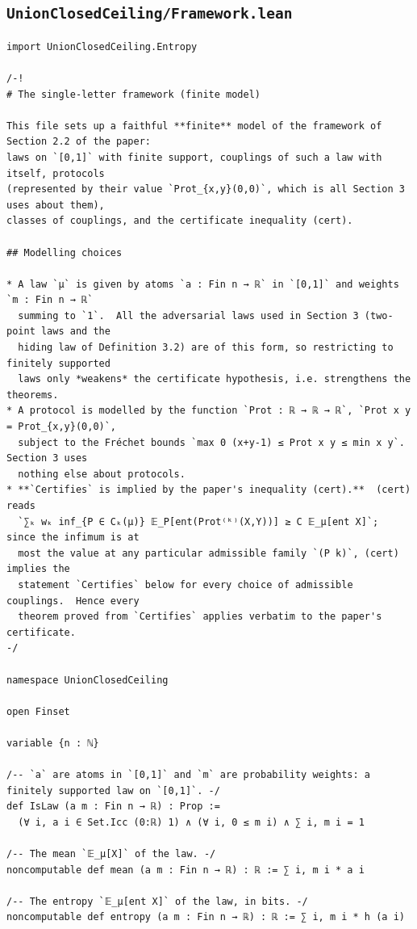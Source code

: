 \documentclass[11pt,a4paper]{article}
\theoremstyle{definition}
\theoremstyle{remark}
\begin{document}
\subsection{\texttt{UnionClosedCeiling/Framework.lean}}
\begin{Verbatim}[fontsize=\scriptsize,formatcom=\leanmono,samepage=false]
import UnionClosedCeiling.Entropy

/-!
# The single-letter framework (finite model)

This file sets up a faithful **finite** model of the framework of Section 2.2 of the paper:
laws on `[0,1]` with finite support, couplings of such a law with itself, protocols
(represented by their value `Prot_{x,y}(0,0)`, which is all Section 3 uses about them),
classes of couplings, and the certificate inequality (cert).

## Modelling choices

* A law `μ` is given by atoms `a : Fin n → ℝ` in `[0,1]` and weights `m : Fin n → ℝ`
  summing to `1`.  All the adversarial laws used in Section 3 (two-point laws and the
  hiding law of Definition 3.2) are of this form, so restricting to finitely supported
  laws only *weakens* the certificate hypothesis, i.e. strengthens the theorems.
* A protocol is modelled by the function `Prot : ℝ → ℝ → ℝ`, `Prot x y = Prot_{x,y}(0,0)`,
  subject to the Fréchet bounds `max 0 (x+y-1) ≤ Prot x y ≤ min x y`.  Section 3 uses
  nothing else about protocols.
* **`Certifies` is implied by the paper's inequality (cert).**  (cert) reads
  `∑ₖ wₖ inf_{P ∈ Cₖ(μ)} 𝔼_P[ent(Prot⁽ᵏ⁾(X,Y))] ≥ C 𝔼_μ[ent X]`; since the infimum is at
  most the value at any particular admissible family `(P k)`, (cert) implies the
  statement `Certifies` below for every choice of admissible couplings.  Hence every
  theorem proved from `Certifies` applies verbatim to the paper's certificate.
-/

namespace UnionClosedCeiling

open Finset

variable {n : ℕ}

/-- `a` are atoms in `[0,1]` and `m` are probability weights: a finitely supported law on `[0,1]`. -/
def IsLaw (a m : Fin n → ℝ) : Prop :=
  (∀ i, a i ∈ Set.Icc (0:ℝ) 1) ∧ (∀ i, 0 ≤ m i) ∧ ∑ i, m i = 1

/-- The mean `𝔼_μ[X]` of the law. -/
noncomputable def mean (a m : Fin n → ℝ) : ℝ := ∑ i, m i * a i

/-- The entropy `𝔼_μ[ent X]` of the law, in bits. -/
noncomputable def entropy (a m : Fin n → ℝ) : ℝ := ∑ i, m i * h (a i)


\end{Verbatim}
\end{document}
